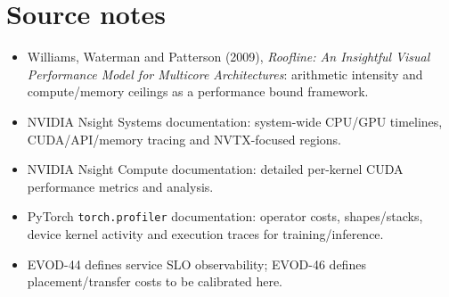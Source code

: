 \chapter*{Source notes}
\begin{itemize}
\item Williams, Waterman and Patterson (2009), \emph{Roofline: An Insightful Visual Performance Model for Multicore Architectures}: arithmetic intensity and compute/memory ceilings as a performance bound framework.
\item NVIDIA Nsight Systems documentation: system-wide CPU/GPU timelines, CUDA/API/memory tracing and NVTX-focused regions.
\item NVIDIA Nsight Compute documentation: detailed per-kernel CUDA performance metrics and analysis.
\item PyTorch \texttt{torch.profiler} documentation: operator costs, shapes/stacks, device kernel activity and execution traces for training/inference.
\item EVOD-44 defines service SLO observability; EVOD-46 defines placement/transfer costs to be calibrated here.
\end{itemize}